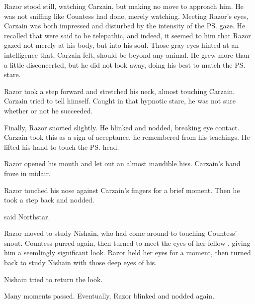 Razor stood still, watching Carzain, but making no move to approach him. 
He was not sniffing like Countess had done, merely watching. 
Meeting Razor's eyes, Carzain was both impressed and disturbed by the intensity of the \ps{\nycan}{} gaze. %
He recalled that \nycans{} were said to be telepathic, and indeed, it seemed to him that Razor gazed not merely at his body, but into his soul. 
Those gray eyes hinted at an intelligence that, Carzain felt, should be beyond any animal. 
He grew more than a little disconcerted, but he did not look away, doing his best to match the \ps{\nycan}{} stare. 

Razor took a step forward and stretched his neck, almost touching Carzain. 
 Carzain tried to tell himself. 
Caught in that hypnotic stare, he was not sure whether or not he succeeded. 

Finally, Razor snorted slightly. 
He blinked and nodded, breaking eye contact. 
Carzain took this as a sign of acceptance. 
 he remembered from his teachings. 
He lifted his hand to touch the \ps{\nycan}{} head. 

Razor opened his mouth and let out an almost inaudible hiss. 
Carzain's hand froze in midair. 

Razor touched his nose against Carzain's fingers for a brief moment. 
Then he took a step back and nodded. 



 said Northstar. 

Razor moved to study Nishain, who had come around to touching Countess' snout. Countess purred again, then turned to meet the eyes of her fellow \nycan, giving him a seemlingly significant look. 
Razor held her eyes for a moment, then turned back to study Nishain with those deep eyes of his. 

Nishain tried to return the look. 

Many moments passed. 
Eventually, Razor blinked and nodded again. 

\begin{comment}
\subsubsection{Passage}
\end{comment}

